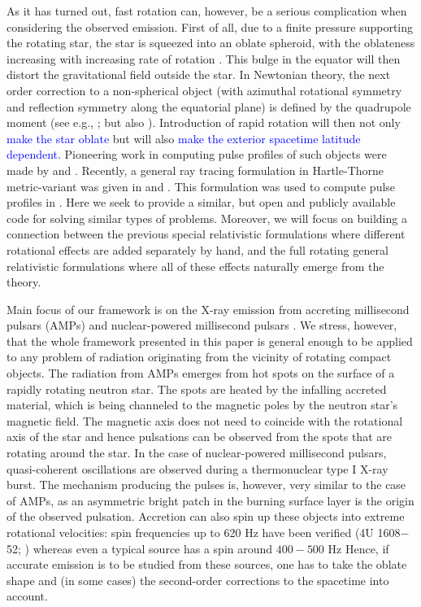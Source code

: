 \documentclass{aa}
\newcommand{\refe}[1]{\textcolor{blue}{{#1}}}
\newcommand{\refedel}[1]{}
\begin{document}
As it has turned out, fast rotation can, however, be a serious complication when considering the observed emission.
First of all, due to a finite pressure supporting the rotating star, the star is squeezed into an oblate spheroid, with the oblateness increasing with increasing rate of rotation \citep{CST94, MS99, MLC07, BBP13, aGM14}.
This bulge in the equator will then distort the gravitational field outside the star.
In Newtonian theory, the next order correction to a non-spherical object (with azimuthal rotational symmetry and reflection symmetry along the equatorial plane) is defined by the quadrupole moment (see e.g., \citealt{LP99}; but also \citealt{PA12}).
Introduction of rapid rotation will then not only\refedel{ break the spherical symmetry of the object} \refe{make the star oblate} but will also \refe{make the exterior spacetime latitude dependent.}
Pioneering work in computing pulse profiles of such objects were made by \citet{CL05} and \citet{CML07}.
Recently, a general ray tracing formulation in Hartle-Thorne metric-variant was given in \citet{PJ12} and \citet{BPO12}. 
This formulation was used to compute pulse profiles in \citet{PO14}.
Here we seek to provide a similar, but open and publicly available code for solving similar types of problems.
Moreover, we will focus on building a connection between the previous special relativistic formulations where different rotational effects are added separately by hand, and the full rotating general relativistic formulations where all of these effects naturally emerge from the theory.


Main focus of our framework is on the X-ray emission from accreting millisecond pulsars (AMPs) \citep{WvdK98, PW12} and nuclear-powered millisecond pulsars \citep{Watts12}.
We stress, however, that the whole framework presented in this paper is general enough to be applied to any problem of radiation originating from the vicinity of rotating compact objects. 
The radiation from AMPs emerges from hot spots on the surface of a rapidly rotating neutron star. The spots are heated by the infalling accreted material, which is being channeled to the magnetic poles by the neutron star's magnetic field.
The magnetic axis does not need to coincide with the rotational axis of the star and hence pulsations can be observed from the spots that are rotating around the star.
In the case of nuclear-powered millisecond pulsars, quasi-coherent oscillations are observed during a thermonuclear type I X-ray burst.
The mechanism producing the pulses is, however, very similar to the case of AMPs, as an asymmetric bright patch in the burning surface layer is the origin of the observed pulsation.
Accretion can also spin up these objects into extreme rotational velocities: spin frequencies up to 620 Hz have been verified (4U 1608$-$52; \citealt{MC02}) whereas even a typical source has a spin around $400-500$ Hz \citep{Watts12, PTR14}
Hence, if accurate emission is to be studied from these sources, one has to take the oblate shape and (in some cases) the second-order corrections to the spacetime into account.
\end{document}
